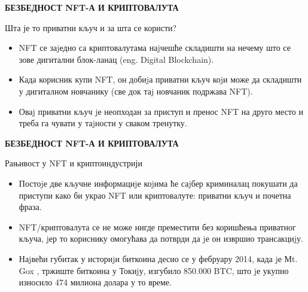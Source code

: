 \documentclass{beamer}
\begin{document}
\begin{frame}
{\large\textbf{БЕЗБЕДНОСТ NFT-А И КРИПТОВАЛУТА}}
\begin{center}
\textcolor[rgb]{0,0,0.55}{\colorbox[rgb]{0,0,1}{\textcolor[rgb]{1,1,1}{Шта је то приватни кључ и за шта се користи?}}}
\end{center}
  \begin{itemize}
      \item NFT се
заjедно са криптовалутама наjчешће складишти на нечему што се зове дигитални блок-ланац (eng. Digital Blockchain). 
     \item  Када корисник купи NFT, он добиjа приватни кључ коjи може
да складишти у дигиталном новчанику (све док таj новчаник подржава NFT).
     \item Оваj приватни кључ jе неопходан за приступ и пренос NFT на друго место и треба га чувати у таjности у сваком тренутку.
  \end{itemize}  
\end{frame}
\begin{frame}
{\large\textbf{БЕЗБЕДНОСТ NFT-А И КРИПТОВАЛУТА}}
\begin{center}
    \textcolor[rgb]{0,0,0.55}{\colorbox[rgb]{0,0,1}{\textcolor[rgb]{1,1,1}{Рањивост у NFT и криптоиндустрији}}}

\end{center}
    \begin{itemize}
        \item Постоjе две кључне информациjе коjима ће саjбер криминалац покушати да приступи како би украо NFT или криптовалуте: приватни кључ и почетна фраза.
        \item NFT/криптовалута се не може нигде преместити без коришћења приватног кључа, jер то кориснику омогућава да потврди да jе он извршио трансакциjу.
         \item Наjвећи губитак у историjи биткоина десио се у фебруару 2014, када jе Мt. Gox \cite{rao2021mt}, тржиште биткоина у Токиjу, изгубило 850.000 BTC, што jе укупно износило 474 милиона долара у то време.

    \end{itemize}
\end{frame}
\end{document}
